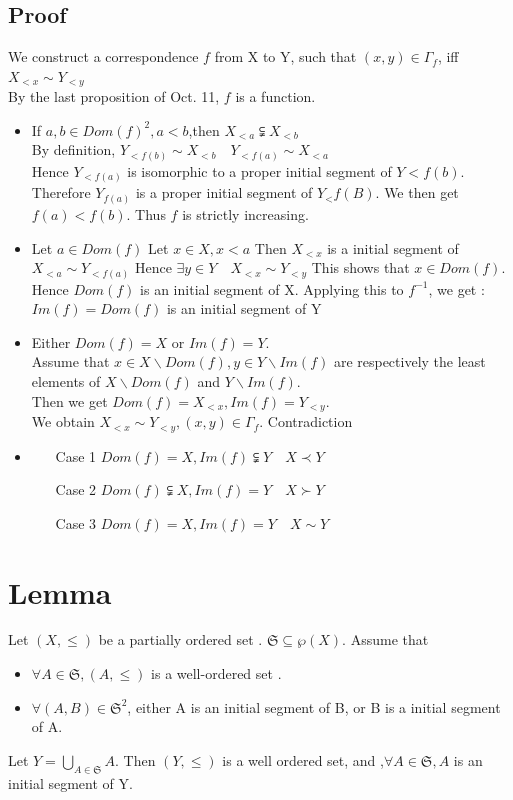 \documentclass{book}
\begin{document}
\subsection*{Proof}
We construct a correspondence $f$ from X to Y, such that $(x,y)\in \Gamma_f$, iff $X_{<x}\sim Y_{<y}$\\By the last proposition of Oct. 11, $f$ is a function.\begin{itemize}
    \item If $a,b\in Dom(f)^2,a<b$,then $X_{<a}\subsetneqq X_{<b}$\\
By definition, $Y_{<f(b)}\sim X_{<b}\quad Y_{<f(a)}\sim X_{<a}$\\
Hence $Y_{<f(a)}$ is isomorphic to a proper initial segment of $Y{<f(b)}$. Therefore $Y_{f(a)}$ is a proper initial segment of $Y_<{f(B)}$. We then get $f(a)<f(b)$. Thus $f$ is strictly increasing.
    \item Let $a\in Dom(f)$ Let $x\in X,x<a$ Then $X_{<x}$ is a initial segment of $X_{<a}\sim Y_{<f(a)}$ Hence $\exists y\in Y\quad X_{<x}\sim Y_{<y}$ This shows that $x\in Dom(f)$. Hence $Dom(f)$ is an initial segment of X. Applying this to $f^{-1}$, we get : $Im(f)=Dom(f)$ is an initial segment of Y
    \item Either $Dom (f)=X$ or $Im(f)=Y$.\\ Assume that $x\in X\backslash Dom (f),y\in Y\backslash Im(f)$ are respectively the least elements of $X\backslash Dom (f)$ and $Y\backslash Im(f)$. \\Then we get $Dom(f)=X_{<x},Im(f)=Y_{<y}$. \\We obtain $X_{<x}\sim Y_{<y},(x,y)\in \Gamma_{f}$. Contradiction
    \item\indent \begin{itemize}
    \item [Case 1] $Dom(f)=X,Im(f)\subsetneqq Y\quad X\prec Y$
    \item [Case 2]$Dom(f)\subsetneqq X, Im(f)=Y\quad X\succ Y$
    \item [Case 3]$Dom(f)=X,Im(f)=Y\quad X\sim Y$
\end{itemize}
\end{itemize}
\section{Lemma}
Let $(X,\leq)$ be a partially ordered set . $\mathfrak{S} \subseteq\wp(X)$. Assume that\begin{itemize}
    \item $\forall A\in \mathfrak{S} , (A,\leq) $ is a well-ordered set .
    \item $\forall (A,B)\in \mathfrak{S} ^2$, either A is an initial segment of B, or B is a initial segment of A.
\end{itemize}
Let $Y=\bigcup\limits_{A\in \mathfrak{S} }A.$ Then $(Y,\leq)$ is a well ordered set, and ,$\forall A\in \mathfrak{S} ,A$ is an initial segment of Y.
\end{document}
